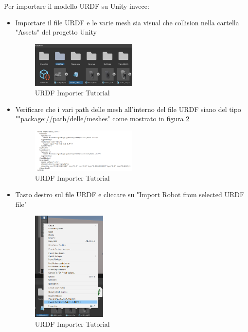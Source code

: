 \documentclass[11pt]{report}
\begin{document}
Per importare il modello URDF su Unity invece:
\begin{itemize}
    \item Importare il file URDF e le varie mesh sia visual che collision nella cartella "Assets" del progetto Unity
    \begin{figure}[H]
        \centering
        \includegraphics[width=0.5\textwidth]{images/URDF_Importer_4.png}
        \caption{URDF Importer Tutorial}
        \label{fig:URDF_Importer_4}
    \end{figure}
    \item Verificare che i vari path delle mesh all'interno del file URDF siano del tipo ""package://path/delle/meshes" come mostrato in figura \ref{fig:URDF_Importer_5}
    \begin{figure}[H]
        \centering
        \includegraphics[width=0.5\textwidth]{images/URDF_Importer_5.png}
        \caption{URDF Importer Tutorial}
        \label{fig:URDF_Importer_5}
    \end{figure}
    \item Tasto destro sul file URDF e cliccare su "Import Robot from selected URDF file"
    \begin{figure}[H]
        \centering
        \includegraphics[width=0.35\textwidth]{images/URDF_Importer_6.png}
        \caption{URDF Importer Tutorial}
        \label{fig:URDF_Importer_6}
    \end{figure}
\end{itemize}
\end{document}
